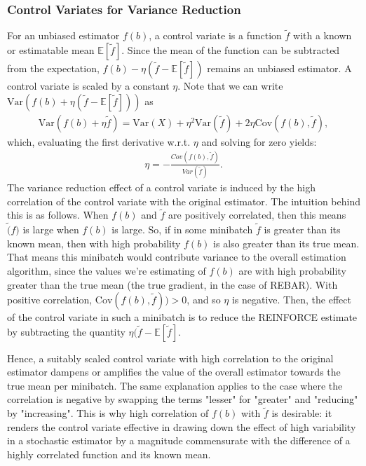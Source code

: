 \documentclass{article}
\newcommand{\var}{\text{Var}}
\begin{document}
\subsubsection{Control Variates for Variance Reduction}
For an unbiased estimator $f(b)$, a control variate is a function $\tilde{f}$ with a known or estimatable mean $\mathbb{E}[\tilde{f}]$. Since the mean of the function can be subtracted from the expectation, $f(b) - \eta (\tilde{f}-\mathbb{E}[\tilde{f}])$ remains an unbiased estimator.
A control variate is scaled by a constant $\eta$.
Note that we can write $\text{Var}(f(b)+\eta(\tilde{f}-\mathbb{E}[\tilde{f}]))$ as
\begin{align}
    \text{Var}(f(b)+\eta \tilde{f}) = \text{Var}(X) + \eta^2\var(\tilde{f}) + 2 \eta \text{Cov}(f(b),\tilde{f}),
\end{align}
which, evaluating the first derivative w.r.t. $\eta$ and solving for zero yields:
\begin{align}
    \eta = -\frac{Cov(f(b), \tilde{f})}{Var(\tilde{f})}.
\end{align}
The variance reduction effect of a control variate is induced by the high correlation of the control variate with the original estimator.
The intuition behind this is as follows.
When $f(b)$ and $\tilde{f}$ are positively correlated, then this means $\tilde(f)$ is large when $f(b)$ is large.
So, if in some minibatch $\tilde{f}$ is greater than its known mean, then with high probability $f(b)$ is also greater than its true mean.
That means this minibatch would contribute variance to the overall estimation algorithm, since the values we're estimating of $f(b)$ are with high probability greater than the true mean (the true gradient, in the case of REBAR). 
With positive correlation, $\text{Cov}(f(b), \tilde{f})) > 0$, and so $\eta$ is negative. 
Then, the effect of the control variate in such a minibatch is to reduce the REINFORCE estimate by subtracting the quantity $\eta(\tilde{f} - \mathbb{E}[\tilde{f}]$.

Hence, a suitably scaled control variate with high correlation to the original estimator dampens or amplifies the value of the overall estimator towards the true mean per minibatch.
The same explanation applies to the case where the correlation is negative by swapping the terms "lesser" for "greater" and "reducing" by "increasing".
This is why high correlation of $f(b)$ with $\tilde{f}$ is desirable: it renders the control variate effective in drawing down the effect of high variability in a stochastic estimator by a magnitude commensurate with the difference of a highly correlated function and its known mean.
\end{document}

